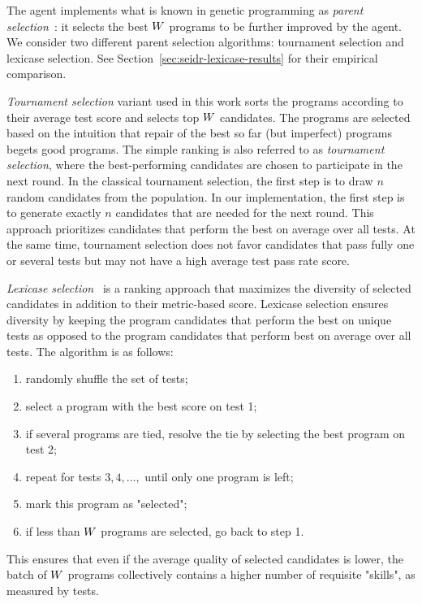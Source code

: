 The \rank{} agent implements what is known in genetic programming as \emph{parent selection}~\cite{koza1994:genetic}: it selects the best $W{}$ programs to be further improved by the \debug{} agent.
We consider two different parent selection algorithms: tournament selection and lexicase selection. 
See Section~\ref{sec:seidr-lexicase-results} for their empirical comparison.

\emph{Tournament selection} variant used in this work sorts the programs according to their average test score and selects top $W{}$ candidates. 
The programs are selected based on the intuition that repair of the best so far (but imperfect) programs begets good programs. 
The simple ranking is also referred to as \emph{tournament selection}, where the best-performing candidates are chosen to participate in the next round.  
In the classical tournament selection, the first step is to draw $n$ random candidates from the population. 
In our implementation, the first step is to generate exactly $n$ candidates that are needed for the next round. 
This approach prioritizes candidates that perform the best on average over all tests.
At the same time, tournament selection does not favor candidates that pass fully one or several tests but may not have a high average test pass rate score. 

\emph{Lexicase selection}~\cite{helmuth2015:solving} is a ranking approach that maximizes the diversity of selected candidates in addition to their metric-based score.
Lexicase selection ensures diversity by keeping the program candidates that perform the best on unique tests as opposed to the program candidates that perform best on average over all tests.
The algorithm is as follows:
\begin{enumerate}

\setlength{\parskip}{0pt}
\setlength\itemsep{0pt}

    \item randomly shuffle the set of tests;
    \item select a program with the best score on test 1;
    \item if several programs are tied, resolve the tie by selecting the best program on test 2;
    \item repeat for tests $3,4,\dots,$ until only one program is left;
    \item mark this program as "selected";
    \item if less than $W$ programs are selected, go back to step 1.
\end{enumerate}
This ensures that even if the average quality of selected candidates is lower, the batch of $W{}$ programs collectively contains a higher number of requisite "skills", as measured by tests.



